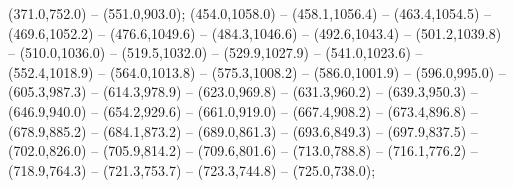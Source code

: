  (371.0,752.0) -- (551.0,903.0);
 (454.0,1058.0) -- (458.1,1056.4) -- (463.4,1054.5) -- (469.6,1052.2) -- (476.6,1049.6) -- (484.3,1046.6) -- (492.6,1043.4) -- (501.2,1039.8) -- (510.0,1036.0) -- (519.5,1032.0) -- (529.9,1027.9) -- (541.0,1023.6) -- (552.4,1018.9) -- (564.0,1013.8) -- (575.3,1008.2) -- (586.0,1001.9) -- (596.0,995.0) -- (605.3,987.3) -- (614.3,978.9) -- (623.0,969.8) -- (631.3,960.2) -- (639.3,950.3) -- (646.9,940.0) -- (654.2,929.6) -- (661.0,919.0) -- (667.4,908.2) -- (673.4,896.8) -- (678.9,885.2) -- (684.1,873.2) -- (689.0,861.3) -- (693.6,849.3) -- (697.9,837.5) -- (702.0,826.0) -- (705.9,814.2) -- (709.6,801.6) -- (713.0,788.8) -- (716.1,776.2) -- (718.9,764.3) -- (721.3,753.7) -- (723.3,744.8) -- (725.0,738.0);
